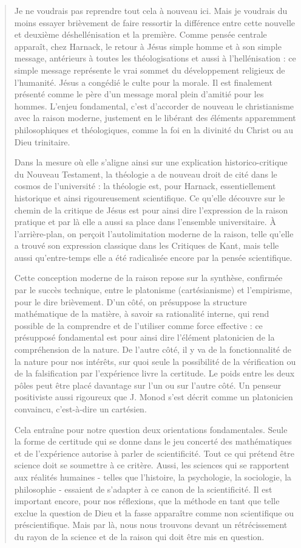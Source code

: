 \begin{quote}
Je ne voudrais pas reprendre tout cela à nouveau ici. Mais je voudrais du moins essayer brièvement de faire ressortir la différence entre cette nouvelle et deuxième déshellénisation et la première. Comme pensée centrale apparaît, chez Harnack, le retour à Jésus simple homme et à son simple message, antérieurs à toutes les théologisations et aussi à l'hellénisation : ce simple message représente le vrai sommet du développement religieux de l'humanité. Jésus a congédié le culte pour la morale. Il est finalement présenté comme le père d'un message moral plein d'amitié pour les hommes. L'enjeu fondamental, c'est d'accorder de nouveau le christianisme avec la raison moderne, justement en le libérant des éléments apparemment philosophiques et théologiques, comme la foi en la divinité du Christ ou au Dieu trinitaire.

Dans la mesure où elle s'aligne ainsi sur une explication historico-critique du Nouveau Testament, la théologie a de nouveau droit de cité dans le cosmos de l'université : la théologie est, pour Harnack, essentiellement historique et ainsi rigoureusement scientifique. Ce qu'elle découvre sur le chemin de la critique de Jésus est pour ainsi dire l'expression de la raison pratique et par là elle a aussi sa place dans l'ensemble universitaire. À l'arrière-plan, on perçoit l'autolimitation moderne de la raison, telle qu'elle a trouvé son expression classique dans les Critiques de Kant, mais telle aussi qu'entre-temps elle a été radicalisée encore par la pensée scientifique.

Cette conception moderne de la raison repose sur la synthèse, confirmée par le succès technique, entre le platonisme (cartésianisme) et l'empirisme, pour le dire brièvement. D'un côté, on présuppose la structure mathématique de la matière, à savoir sa rationalité interne, qui rend possible de la comprendre et de l'utiliser comme force effective : ce présupposé fondamental est pour ainsi dire l'élément platonicien de la compréhension de la nature. De l'autre côté, il y va de la fonctionnalité de la nature pour nos intérêts, sur quoi seule la possibilité de la vérification ou de la falsification par l'expérience livre la certitude. Le poids entre les deux pôles peut être placé davantage sur l'un ou sur l'autre côté. Un penseur positiviste aussi rigoureux que J. Monod s'est décrit comme un platonicien convaincu, c'est-à-dire un cartésien.

Cela entraîne pour notre question deux orientations fondamentales. Seule la forme de certitude qui se donne dans le jeu concerté des mathématiques et de l'expérience autorise à parler de scientificité. Tout ce qui prétend être science doit se soumettre à ce critère. Aussi, les sciences qui se rapportent aux réalités humaines - telles que l'histoire, la psychologie, la sociologie, la philosophie - essaient de s'adapter à ce canon de la scientificité. Il est important encore, pour nos réflexions, que la méthode en tant que telle exclue la question de Dieu et la fasse apparaître comme non scientifique ou préscientifique. Mais par là, nous nous trouvons devant un rétrécissement du rayon de la science et de la raison qui doit être mis en question.


\end{quote}
